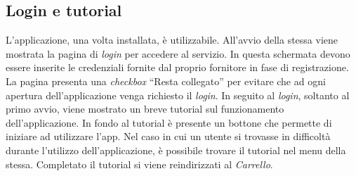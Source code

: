 \documentclass[12pt, a4paper, titlepage]{report}
\begin{document}
	\subsection{Login e tutorial}
	
	L'applicazione, una volta installata, è utilizzabile. All'avvio della stessa viene mostrata la pagina di \textit{login} per accedere al servizio. In questa schermata devono essere inserite le credenziali fornite dal proprio fornitore in fase di registrazione. La pagina presenta una \textit{checkbox} ``Resta collegato'' per evitare che ad ogni apertura dell'applicazione venga richiesto il \textit{login}. In seguito al \textit{login}, soltanto al primo avvio, viene mostrato un breve tutorial sul funzionamento dell'applicazione. In fondo al tutorial è presente un bottone che permette di iniziare ad utilizzare l'app. Nel caso in cui un utente si trovasse in difficoltà durante l'utilizzo dell'applicazione, è possibile trovare il tutorial nel menu della stessa. Completato il tutorial si viene reindirizzati al \textit{Carrello}.
	
\end{document}
